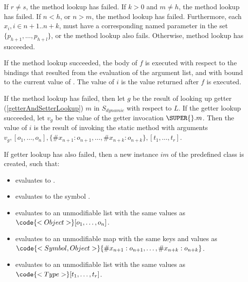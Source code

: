 \documentclass{article}
\begin{document}
%
%
%
\LMHash{}
If $r \not= s$, the method lookup has failed.
If $k > 0$ and $m \not= h$, the method lookup has failed.
If $n < h$, or $n > m$, the method lookup has failed.
Furthermore, each
$x_i, i \in n+1 .. n+k$, must have a corresponding named parameter in the set
$\{p_{h+1}, \ldots, p_{h+l}\}$,
or the method lookup also fails.
Otherwise, method lookup has succeeded.

\LMHash{}
If the method lookup succeeded,
the body of $f$ is executed with respect to the bindings that resulted from the evaluation of the argument list,
and with \THIS{} bound to the current value of \THIS{}.
The value of $i$ is the value returned after $f$ is executed.

\LMHash{}
If the method lookup has failed,
then let $g$ be the result of looking up getter (\ref{getterAndSetterLookup}) $m$ in $S_{dynamic}$ with respect to $L$.
If the getter lookup succeeded,
let $v_g$ be the value of the getter invocation $\SUPER{}.m$.
Then the value of $i$ is the result of invoking
the static method
with arguments
$v_g,
[o_1, \ldots, o_n],
\{\#x_{n+1}: o_{n+1}, \ldots, \#x_{n+k}: o_{n+k}\},
[t_1, \ldots, t_r]$.

\LMHash{}
If getter lookup has also failed,
then a new instance $im$ of the predefined class  is created, such that:
\begin{itemize}
\item {} evaluates to \code{\TRUE{}}.
\item {} evaluates to the symbol .
\item {} evaluates to an unmodifiable list with the same values as
$\code{<Object>}[o_1, \ldots, o_n]$.
\item {} evaluates to an unmodifiable map with the same keys and values as
$\code{<Symbol, Object>}\{\#x_{n+1}: o_{n+1}, \ldots, \#x_{n+k}: o_{n+k}\}$.
\item {} evaluates to an unmodifiable list with the same values as
$\code{<Type>}[t_1, \ldots, t_r]$.
\end{itemize}
\end{document}
